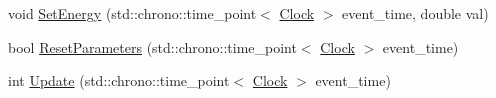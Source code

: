 \begin{DoxyCompactItemize}
\item 
void \mbox{\hyperlink{classNeurotransmitter_a5ad51ddb1351868e1756e3c41bb88e04}{Set\+Energy}} (std\+::chrono\+::time\+\_\+point$<$ \mbox{\hyperlink{universe_8h_a0ef8d951d1ca5ab3cfaf7ab4c7a6fd80}{Clock}} $>$ event\+\_\+time, double val)
\item 
bool \mbox{\hyperlink{classNeurotransmitter_a6e7650d738bccfbbd49ede10970687aa}{Reset\+Parameters}} (std\+::chrono\+::time\+\_\+point$<$ \mbox{\hyperlink{universe_8h_a0ef8d951d1ca5ab3cfaf7ab4c7a6fd80}{Clock}} $>$ event\+\_\+time)
\item 
int \mbox{\hyperlink{classNeurotransmitter_ac9f7be22ca7242207de76ec5e1b055b1}{Update}} (std\+::chrono\+::time\+\_\+point$<$ \mbox{\hyperlink{universe_8h_a0ef8d951d1ca5ab3cfaf7ab4c7a6fd80}{Clock}} $>$ event\+\_\+time)
\end{DoxyCompactItemize}
